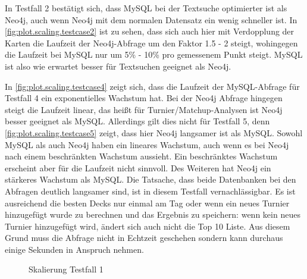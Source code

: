 In Testfall 2 bestätigt sich, dass MySQL bei der Textsuche optimierter ist als Neo4j, auch wenn Neo4j mit dem normalen Datensatz ein wenig schneller ist. In \autoref{fig:plot.scaling.testcase2} ist zu sehen, dass sich auch hier mit Verdopplung der Karten die Laufzeit der Neo4j-Abfrage um den Faktor 1.5 - 2 steigt, wohingegen die Laufzeit bei MySQL nur um 5\% - 10\% pro gemessenem Punkt steigt. MySQL ist also wie erwartet besser für Textsuchen geeignet als Neo4j.

In \autoref{fig:plot.scaling.testcase4} zeigt sich, dass die Laufzeit der MySQL-Abfrage für Testfall 4 ein exponentielles Wachstum hat. Bei der Neo4j Abfrage hingegen steigt die Laufzeit linear, das heißt für Turnier/Matchup-Analysen ist Neo4j besser geeignet als MySQL. Allerdings gilt dies nicht für Testfall 5, denn \autoref{fig:plot.scaling.testcase5} zeigt, dass hier Neo4j langsamer ist als MySQL. Sowohl MySQL als auch Neo4j haben ein lineares Wachstum, auch wenn es bei Neo4j nach einem beschränkten Wachstum aussieht. Ein beschränktes Wachstum erscheint aber für die Laufzeit nicht sinnvoll. Des Weiteren hat Neo4j ein stärkeres Wachstum als MySQL. Die Tatsache, dass beide Datenbanken bei den Abfragen deutlich langsamer sind, ist in diesem Testfall vernachlässigbar. Es ist ausreichend die besten Decks nur einmal am Tag oder wenn ein neues Turnier hinzugefügt wurde zu berechnen und das Ergebnis zu speichern: wenn kein neues Turnier hinzugefügt wird, ändert sich auch nicht die Top 10 Liste. Aus diesem Grund muss die Abfrage nicht in Echtzeit geschehen sondern kann durchaus einige Sekunden in Anspruch nehmen.

\begin{figure}[t]
    \myfloatalign
    \caption{Skalierung Testfall 1}
    \label{fig:plot.scaling.testcase1}
\end{figure}

